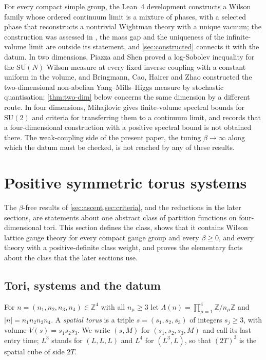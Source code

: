 \documentclass[11pt,a4paper]{amsart}
\theoremstyle{definition}
\theoremstyle{remark}
\numberwithin{equation}{section}
\newcommand{\Z}{\mathbb{Z}}          %
\newcommand{\SU}{\mathrm{SU}}              %
\newcommand{\Vol}[1]{V(#1)}                %
\newcommand{\cube}[1]{(2#1)^3}             %
\begin{document}
For every compact simple group, the Lean~4 development \cite{openaiym} constructs a Wilson family whose ordered continuum limit is a mixture of phases, with a selected phase that reconstructs a nontrivial Wightman theory with a unique vacuum; the construction was assessed in \cite{ymgroup2026}, the mass gap and the uniqueness of the infinite-volume limit are outside its statement, and \cref{sec:constructed} connects it with the datum. In two dimensions, Piazza and Shen \cite{piazza2026} proved a log-Sobolev inequality for the $\SU(N)$ Wilson measure at every fixed inverse coupling with a constant uniform in the volume, and Bringmann, Cao, Hairer and Zhao \cite{bringmann2026} constructed the two-dimensional non-abelian Yang--Mills--Higgs measure by stochastic quantisation; \cref{thm:two-dim} below concerns the same dimension by a different route. In four dimensions, Mihajlovic \cite{mihajlovic2026} gives finite-volume spectral bounds for $\SU(2)$ and criteria for transferring them to a continuum limit, and records that a four-dimensional construction with a positive spectral bound is not obtained there. The weak-coupling side of the present paper, the tuning $\beta\to\infty$ along which the datum must be checked, is not reached by any of these results.
\section{Positive symmetric torus systems}\label{sec:psts}

The $\beta$-free results of \cref{sec:ascent,sec:criteria}, and the reductions in the later sections, are statements about one abstract class of partition functions on four-dimensional tori. This section defines the class, shows that it contains Wilson lattice gauge theory for every compact gauge group and every $\beta\ge0$, and every theory with a positive-definite class weight, and proves the elementary facts about the class that the later sections use.

\subsection{Tori, systems and the datum}

For $n=(n_1,n_2,n_3,n_4)\in\Z^4$ with all $n_\mu\ge3$ let $\Lambda(n)=\prod_{\mu=1}^4\Z/n_\mu\Z$ and $|n|=n_1n_2n_3n_4$. A \emph{spatial torus} is a triple $s=(s_1,s_2,s_3)$ of integers $s_j\ge3$, with volume $\Vol{s}=s_1s_2s_3$. We write $(s,M)$ for $(s_1,s_2,s_3,M)$ and call its last entry time; $L^3$ stands for $(L,L,L)$ and $L^4$ for $(L^3,L)$, so that $\cube{T}$ is the spatial cube of side $2T$.
\end{document}
